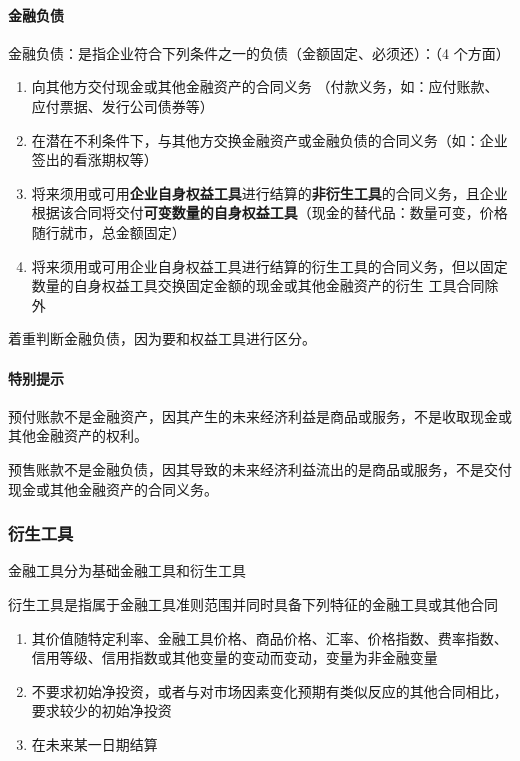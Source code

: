 \documentclass[UTF8,12pt]{ctexart}
\numberwithin{equation}{section} %
\numberwithin{figure}{section}
\numberwithin{table}{section}
\begin{document}
	\paragraph{金融负债}
	
	金融负债：是指企业符合下列条件之一的负债（金额固定、必须还）：（4 个方面）
	\begin{enumerate}
		\item 向其他方交付现金或其他金融资产的合同义务
		（付款义务，如：应付账款、应付票据、发行公司债券等）
		
		\item 在潜在不利条件下，与其他方交换金融资产或金融负债的合同义务（如：企业签出的看涨期权等）
		
		\item 将来须用或可用\textbf{企业自身权益工具}进行结算的\textbf{非衍生工具}的合同义务，且企业根据该合同将交付\textbf{可变数量的自身权益工具}（现金的替代品：数量可变，价格随行就市，总金额固定）
		
		\item 将来须用或可用企业自身权益工具进行结算的衍生工具的合同义务，但以固定数量的自身权益工具交换固定金额的现金或其他金融资产的衍生 工具合同除外
	\end{enumerate}

	着重判断金融负债，因为要和权益工具进行区分。
	
	\paragraph{特别提示}
	预付账款不是金融资产，因其产生的未来经济利益是商品或服务，不是收取现金或其他金融资产的权利。
	
	预售账款不是金融负债，因其导致的未来经济利益流出的是商品或服务，不是交付现金或其他金融资产的合同义务。
	
	
	\subsubsection{衍生工具}
	金融工具分为基础金融工具和衍生工具
	
	衍生工具是指属于金融工具准则范围并同时具备下列特征的金融工具或其他合同
	\begin{enumerate}
		\item 其价值随特定利率、金融工具价格、商品价格、汇率、价格指数、费率指数、信用等级、信用指数或其他变量的变动而变动，变量为非金融变量
		
		\item 不要求初始净投资，或者与对市场因素变化预期有类似反应的其他合同相比，要求较少的初始净投资
		
		\item 在未来某一日期结算
	\end{enumerate}
	
\end{document}
